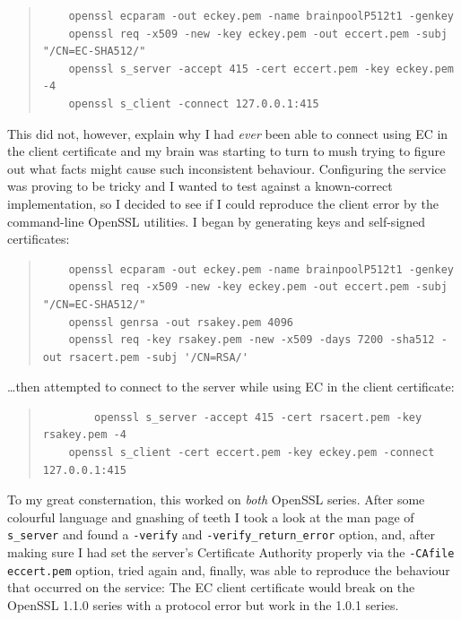 \documentclass{article}
\begin{document}
\begin{quote}
\begin{verbatim}
	openssl ecparam -out eckey.pem -name brainpoolP512t1 -genkey
	openssl req -x509 -new -key eckey.pem -out eccert.pem -subj "/CN=EC-SHA512/"
	openssl s_server -accept 415 -cert eccert.pem -key eckey.pem -4
	openssl s_client -connect 127.0.0.1:415
\end{verbatim}
\end{quote}

This did not, however, explain why I had \emph{ever} been able to connect using EC in the client certificate and my brain was starting to turn to mush trying to figure out what facts might cause such inconsistent behaviour.  Configuring the service was proving to be tricky and I wanted to test against a known-correct implementation, so I decided to see if I could reproduce the client error by the command-line OpenSSL utilities.  I began by generating keys and self-signed certificates:

\begin{quote}
\begin{verbatim}
	openssl ecparam -out eckey.pem -name brainpoolP512t1 -genkey
	openssl req -x509 -new -key eckey.pem -out eccert.pem -subj "/CN=EC-SHA512/"
	openssl genrsa -out rsakey.pem 4096
	openssl req -key rsakey.pem -new -x509 -days 7200 -sha512 -out rsacert.pem -subj '/CN=RSA/'
\end{verbatim}
\end{quote}

\ldots then attempted to connect to the server while using EC in the client certificate:

\begin{quote}
\begin{verbatim}
        openssl s_server -accept 415 -cert rsacert.pem -key rsakey.pem -4
	openssl s_client -cert eccert.pem -key eckey.pem -connect 127.0.0.1:415
\end{verbatim}
\end{quote}

To my great consternation, this worked on \emph{both} OpenSSL series.  After some colourful language and gnashing of teeth I took a look at the man page of \texttt{s_server} and found a \texttt{-verify} and \texttt{-verify_return_error} option, and, after making sure I had set the server's Certificate Authority properly via the \texttt{-CAfile eccert.pem} option, tried again and, finally, was able to reproduce the behaviour that occurred on the service: The EC client certificate would break on the OpenSSL 1.1.0 series with a protocol error but work in the 1.0.1 series.
\end{document}
